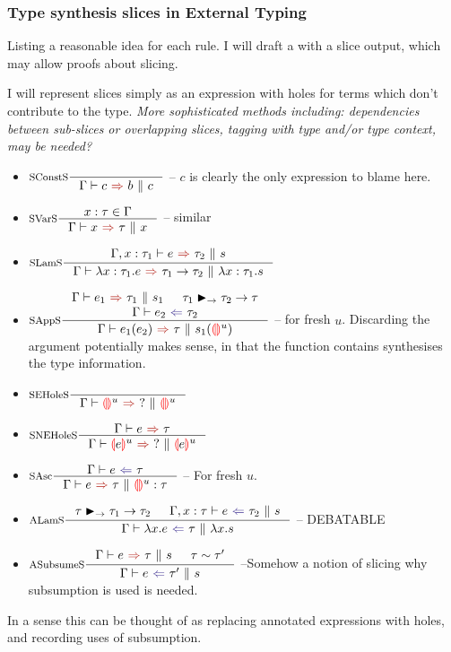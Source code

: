 \subsubsection{Type synthesis slices in External Typing}
Listing a reasonable idea for each rule. I will draft a  with a slice output, which may allow proofs about slicing.\par  
I will represent slices simply as an expression with holes for terms which don't contribute to the type. \textit{More sophisticated methods including: dependencies between sub-slices or overlapping slices, tagging with type and/or type context, may be needed?}
\begin{itemize}
\item $\inference[SConstS]{}{\synthesisSlice{c}{b}{c}}$ -- $c$ is clearly the only expression to blame here.
\item $\inference[SVarS]{x:\tau \in \Gamma}{\synthesisSlice{x}{\tau}{x}}$ -- similar
\item $\inference[SLamS]{\synthesisSlice[\Gamma, x:\tau_1]{e}{\tau_2}{s}}{\synthesisSlice{\lambda x:\tau_1.e}{\tau_1 \to \tau_2}{\lambda x:\tau_1. s}}$
\item $\inference[SAppS]{\synthesisSlice{e_1}{\tau_1}{s_1} & \tau_1 \funmatch \tau_2 \to \tau\\ \analysis{e_2}{\tau_2}}{\synthesisSlice{e_1(e_2)}{\tau}{s_1(\hole^u)}}$ -- for fresh $u$. Discarding the argument potentially makes sense, in that the function contains synthesises the type information.
\item $\inference[SEHoleS]{}{\synthesisSlice{\hole^u}{?}{\hole^u}}$
\item $\inference[SNEHoleS]{\synthesis{e}{\tau}}{\synthesisSlice{\hole[e]^u}{?}{\hole[e]^u}}$
\item $\inference[SAsc]{\analysis{e}{\tau}}{\synthesisSlice{e}{\tau}{\hole^u : \tau}}$ -- For fresh $u$.
\item $\inference[ALamS]{\tau \funmatch \tau_1 \to \tau_2 & \analysisSlice[\Gamma, x:\tau]{e}{\tau_2}{s}}{\analysisSlice{\lambda x. e}{\tau}{\lambda x. s}}$ -- DEBATABLE
\item $\inference[ASubsumeS]{\synthesisSlice{e}{\tau}{s} & \tau \sim \tau'}{\analysisSlice{e}{\tau'}{s}}$ --Somehow a notion of slicing why subsumption is used is needed.
\end{itemize}
In a sense this can be thought of as replacing annotated expressions with holes, and recording uses of subsumption.

